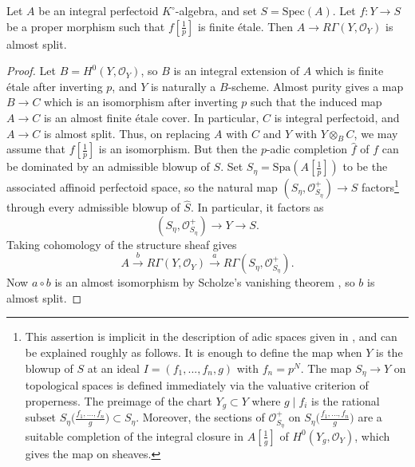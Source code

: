 \documentclass[10pt,reqno]{amsart}
\begin{document}
\begin{proposition}
\label{prop:DDSCAdmissibleAlteration}
Let $A$ be an integral perfectoid $K^\circ$-algebra, and set $S = \mathrm{Spec}(A)$. Let $f:Y \to S$ be a proper morphism such that $f[\frac{1}{p}]$ is finite \'etale. Then $A \to R\Gamma(Y,\mathcal{O}_Y)$ is almost split.
\end{proposition}
\begin{proof}
Let $B = H^0(Y, \mathcal{O}_Y)$, so $B$ is an integral extension of $A$ which is finite \'etale after inverting $p$, and $Y$ is naturally a $B$-scheme. Almost purity \cite[Theorem 7.9 (iii)]{ScholzePerfectoidSpaces} gives a map $B \to C$ which is an isomorphism after inverting $p$ such that the induced map $A \to C$ is an almost finite \'etale cover. In particular, $C$ is integral perfectoid, and $A \to C$ is almost split. Thus, on replacing $A$ with $C$ and $Y$ with $Y \otimes_B C$, we may assume that $f[\frac{1}{p}]$ is an isomorphism. But then the $p$-adic completion $\widehat{f}$ of $f$ can be dominated by an admissible blowup of $S$. Set $S_\eta  = \mathrm{Spa}(A[\frac{1}{p}])$ to be the associated affinoid perfectoid space, so the natural map $(S_\eta, \mathcal{O}_{S_\eta}^+) \to S$ factors\footnote{This assertion is implicit in the description of adic spaces given in \cite[\S 15.4]{GabberRameroFART}, and can be explained roughly as follows. It is enough to define the map when $Y$ is the blowup of $S$ at an ideal $I = (f_1,...,f_n,g)$ with $f_n = p^N$. The map $S_\eta \to Y$ on topological spaces is defined immediately via the valuative criterion of properness. The preimage of the chart $Y_g \subset Y$ where $g \mid f_i$ is the rational subset $S_\eta\Big(\frac{f_1,...,f_n}{g}\Big) \subset S_\eta$. Moreover, the sections of $\mathcal{O}_{S_\eta}^+$ on $S_\eta\Big(\frac{f_1,...,f_n}{g}\Big)$ are a suitable completion of the integral closure in $A[\frac{1}{g}]$ of $H^0(Y_g,\mathcal{O}_Y)$, which gives the map on sheaves.}  through every admissible blowup of $\widehat{S}$. In particular, it factors as
\[ (S_\eta, \mathcal{O}^+_{S_\eta}) \to Y \to S.\]
Taking cohomology of the structure sheaf gives 
\[ A \xrightarrow{b} R\Gamma(Y, \mathcal{O}_Y) \xrightarrow{a} R\Gamma(S_\eta, \mathcal{O}^+_{S_\eta}).\]
Now $a \circ b$ is an almost isomorphism by Scholze's vanishing theorem \cite[Proposition 6.14]{ScholzePerfectoidSpaces}, so $b$ is almost split. 
\end{proof}
\end{document}
